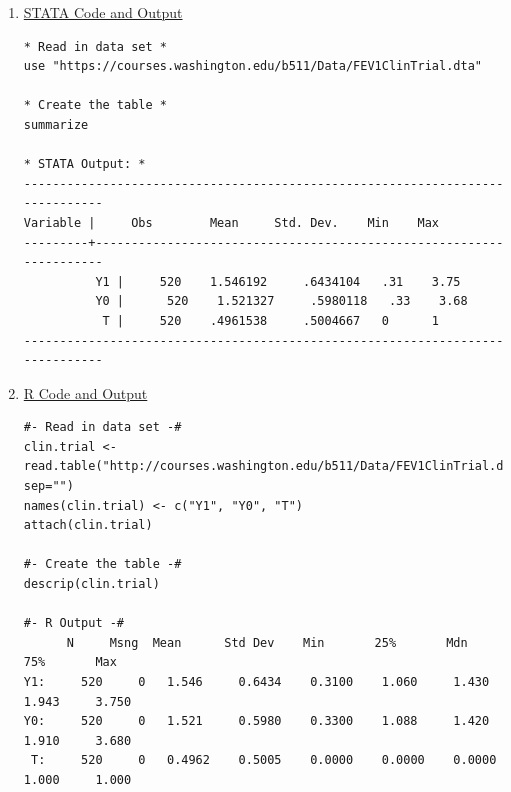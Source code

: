 \documentclass[11pt,letterpaper,fleqn]{report}
\begin{document}
\begin{enumerate}[]
\item \underline{STATA Code and Output}
{\scriptsize
\begin{verbatim}
* Read in data set *
use "https://courses.washington.edu/b511/Data/FEV1ClinTrial.dta"

* Create the table *
summarize

* STATA Output: *
------------------------------------------------------------------------------
Variable |     Obs        Mean     Std. Dev.	Min	   Max
---------+--------------------------------------------------------------------
	      Y1 |     520    1.546192     .6434104   .31    3.75
	      Y0 |	    520    1.521327     .5980118   .33    3.68
	       T |     520    .4961538     .5004667   0      1
------------------------------------------------------------------------------

\end{verbatim}}


\item \underline{R Code and Output}
{\scriptsize
\begin{verbatim}
#- Read in data set -#
clin.trial <- read.table("http://courses.washington.edu/b511/Data/FEV1ClinTrial.dat", sep="")
names(clin.trial) <- c("Y1", "Y0", "T")
attach(clin.trial)

#- Create the table -#
descrip(clin.trial)

#- R Output -# 
      N     Msng  Mean      Std Dev    Min       25%       Mdn       75%       Max     
Y1:     520     0   1.546     0.6434    0.3100    1.060     1.430     1.943     3.750  
Y0:     520     0   1.521     0.5980    0.3300    1.088     1.420     1.910     3.680  
 T:     520     0   0.4962    0.5005    0.0000    0.0000    0.0000    1.000     1.000  
\end{verbatim}}
\end{enumerate}
\end{document}
